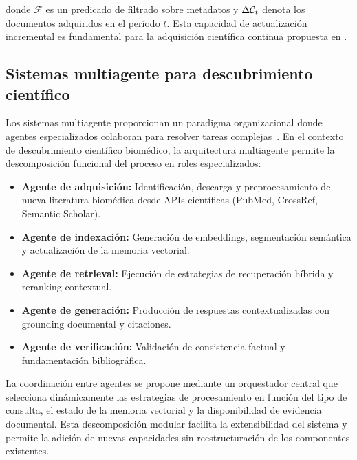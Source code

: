 \noindent donde $\mathcal{F}$ es un predicado de filtrado sobre metadatos y $\Delta\mathcal{C}_t$ denota los documentos adquiridos en el período $t$. Esta capacidad de actualización incremental es fundamental para la adquisición científica continua propuesta en \sirca{}.

\subsection{Sistemas multiagente para descubrimiento científico}
\label{subsec:tf_multiagent}

Los sistemas multiagente proporcionan un paradigma organizacional donde agentes especializados colaboran para resolver tareas complejas~\cite{wooldridge2009introduction}. En el contexto de descubrimiento científico biomédico, la arquitectura multiagente permite la descomposición funcional del proceso en roles especializados:

\begin{itemize}[leftmargin=*]
  \item \textbf{Agente de adquisición:} Identificación, descarga y preprocesamiento de nueva literatura biomédica desde APIs científicas (PubMed, CrossRef, Semantic Scholar).
  \item \textbf{Agente de indexación:} Generación de embeddings, segmentación semántica y actualización de la memoria vectorial.
  \item \textbf{Agente de retrieval:} Ejecución de estrategias de recuperación híbrida y reranking contextual.
  \item \textbf{Agente de generación:} Producción de respuestas contextualizadas con grounding documental y citaciones.
  \item \textbf{Agente de verificación:} Validación de consistencia factual y fundamentación bibliográfica.
\end{itemize}

La coordinación entre agentes se propone mediante un orquestador central que selecciona dinámicamente las estrategias de procesamiento en función del tipo de consulta, el estado de la memoria vectorial y la disponibilidad de evidencia documental. Esta descomposición modular facilita la extensibilidad del sistema y permite la adición de nuevas capacidades sin reestructuración de los componentes existentes.
